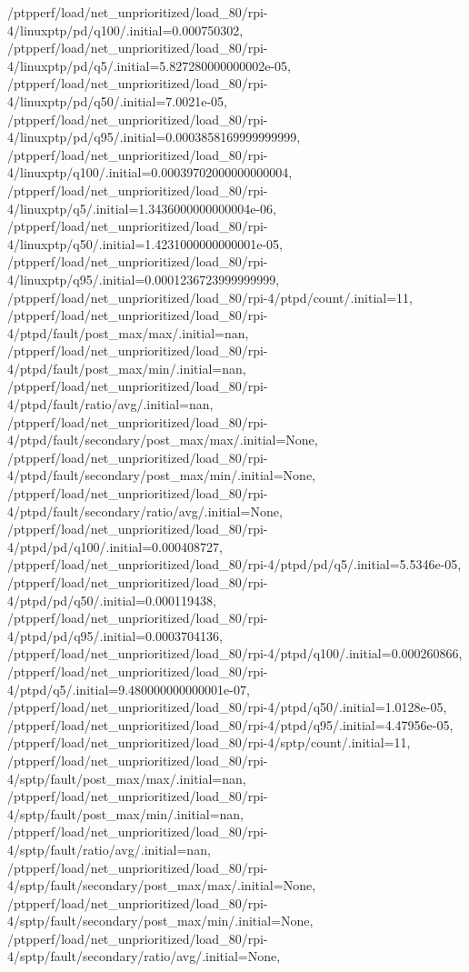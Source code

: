 {    /ptpperf/load/net_unprioritized/load_80/rpi-4/linuxptp/pd/q100/.initial=0.000750302,
    /ptpperf/load/net_unprioritized/load_80/rpi-4/linuxptp/pd/q5/.initial=5.827280000000002e-05,
    /ptpperf/load/net_unprioritized/load_80/rpi-4/linuxptp/pd/q50/.initial=7.0021e-05,
    /ptpperf/load/net_unprioritized/load_80/rpi-4/linuxptp/pd/q95/.initial=0.0003858169999999999,
    /ptpperf/load/net_unprioritized/load_80/rpi-4/linuxptp/q100/.initial=0.00039702000000000004,
    /ptpperf/load/net_unprioritized/load_80/rpi-4/linuxptp/q5/.initial=1.3436000000000004e-06,
    /ptpperf/load/net_unprioritized/load_80/rpi-4/linuxptp/q50/.initial=1.4231000000000001e-05,
    /ptpperf/load/net_unprioritized/load_80/rpi-4/linuxptp/q95/.initial=0.0001236723999999999,
    /ptpperf/load/net_unprioritized/load_80/rpi-4/ptpd/count/.initial=11,
    /ptpperf/load/net_unprioritized/load_80/rpi-4/ptpd/fault/post_max/max/.initial=nan,
    /ptpperf/load/net_unprioritized/load_80/rpi-4/ptpd/fault/post_max/min/.initial=nan,
    /ptpperf/load/net_unprioritized/load_80/rpi-4/ptpd/fault/ratio/avg/.initial=nan,
    /ptpperf/load/net_unprioritized/load_80/rpi-4/ptpd/fault/secondary/post_max/max/.initial=None,
    /ptpperf/load/net_unprioritized/load_80/rpi-4/ptpd/fault/secondary/post_max/min/.initial=None,
    /ptpperf/load/net_unprioritized/load_80/rpi-4/ptpd/fault/secondary/ratio/avg/.initial=None,
    /ptpperf/load/net_unprioritized/load_80/rpi-4/ptpd/pd/q100/.initial=0.000408727,
    /ptpperf/load/net_unprioritized/load_80/rpi-4/ptpd/pd/q5/.initial=5.5346e-05,
    /ptpperf/load/net_unprioritized/load_80/rpi-4/ptpd/pd/q50/.initial=0.000119438,
    /ptpperf/load/net_unprioritized/load_80/rpi-4/ptpd/pd/q95/.initial=0.0003704136,
    /ptpperf/load/net_unprioritized/load_80/rpi-4/ptpd/q100/.initial=0.000260866,
    /ptpperf/load/net_unprioritized/load_80/rpi-4/ptpd/q5/.initial=9.480000000000001e-07,
    /ptpperf/load/net_unprioritized/load_80/rpi-4/ptpd/q50/.initial=1.0128e-05,
    /ptpperf/load/net_unprioritized/load_80/rpi-4/ptpd/q95/.initial=4.47956e-05,
    /ptpperf/load/net_unprioritized/load_80/rpi-4/sptp/count/.initial=11,
    /ptpperf/load/net_unprioritized/load_80/rpi-4/sptp/fault/post_max/max/.initial=nan,
    /ptpperf/load/net_unprioritized/load_80/rpi-4/sptp/fault/post_max/min/.initial=nan,
    /ptpperf/load/net_unprioritized/load_80/rpi-4/sptp/fault/ratio/avg/.initial=nan,
    /ptpperf/load/net_unprioritized/load_80/rpi-4/sptp/fault/secondary/post_max/max/.initial=None,
    /ptpperf/load/net_unprioritized/load_80/rpi-4/sptp/fault/secondary/post_max/min/.initial=None,
    /ptpperf/load/net_unprioritized/load_80/rpi-4/sptp/fault/secondary/ratio/avg/.initial=None,
}
